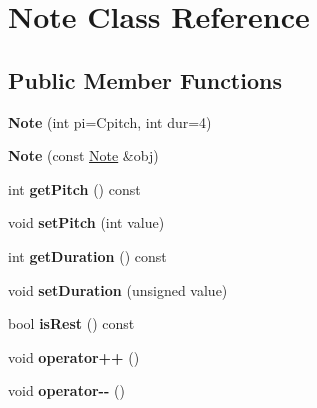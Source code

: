 \hypertarget{class_note}{}\section{Note Class Reference}
\label{class_note}
\subsection*{Public Member Functions}
\begin{DoxyCompactItemize}
\item 
\hypertarget{class_note_a15f24ce09b151698b706b10317dda8f5}{}{\bfseries Note} (int pi=Cpitch, int dur=4)\label{class_note_a15f24ce09b151698b706b10317dda8f5}

\item 
\hypertarget{class_note_a2bb5143ddd22a39471ecde82ad36ba1a}{}{\bfseries Note} (const \hyperlink{class_note}{Note} \&obj)\label{class_note_a2bb5143ddd22a39471ecde82ad36ba1a}

\item 
\hypertarget{class_note_adf42f07510d85bb1076f6e5dc6083d3c}{}int {\bfseries get\+Pitch} () const \label{class_note_adf42f07510d85bb1076f6e5dc6083d3c}

\item 
\hypertarget{class_note_ab542035784588db1d5be661414509af3}{}void {\bfseries set\+Pitch} (int value)\label{class_note_ab542035784588db1d5be661414509af3}

\item 
\hypertarget{class_note_aab9a1337e71fae0c910a2749516046f0}{}int {\bfseries get\+Duration} () const \label{class_note_aab9a1337e71fae0c910a2749516046f0}

\item 
\hypertarget{class_note_abb204bf93a2a3aea4237d6cf1638348f}{}void {\bfseries set\+Duration} (unsigned value)\label{class_note_abb204bf93a2a3aea4237d6cf1638348f}

\item 
\hypertarget{class_note_a5514ac8d4e41243402e4a6c59675059b}{}bool {\bfseries is\+Rest} () const \label{class_note_a5514ac8d4e41243402e4a6c59675059b}

\item 
\hypertarget{class_note_a59382ba872b863d7685fb6a864b66c24}{}void {\bfseries operator++} ()\label{class_note_a59382ba872b863d7685fb6a864b66c24}

\item 
\hypertarget{class_note_a1d1a0915b0957fa0461ccb35d8a355e8}{}void {\bfseries operator-\/-\/} ()\label{class_note_a1d1a0915b0957fa0461ccb35d8a355e8}


\end{DoxyCompactItemize}
